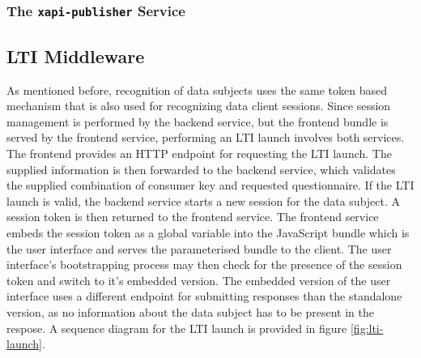 \documentclass[a4paper,11pt]{article}
\def\inline{\lstinline[basicstyle=\ttfamily,keywordstyle={}]}
\begin{document}
            \subsubsection{The \inline{xapi-publisher} Service}

        \subsection{LTI Middleware}
            As mentioned before, recognition of data subjects uses the same token based
            mechanism that is also used for recognizing data client sessions.
            Since session management is performed by the backend service,
            but the frontend bundle is served by the frontend service, performing
            an LTI launch involves both services. The frontend provides an HTTP
            endpoint for requesting the LTI launch. The supplied information
            is then forwarded to the backend service, which validates
            the supplied combination of consumer key and requested questionnaire.
            If the LTI launch is valid, the backend service starts a new session
            for the data subject. A session token is then returned to the frontend
            service. The frontend service embeds the session token as a global
            variable into the JavaScript bundle which is the user interface and
            serves the parameterised bundle to the client.
            The user interface's bootstrapping process may then check for
            the presence of the session token and switch to it's embedded version.
            The embedded version of the user interface uses a different endpoint
            for submitting responses than the standalone version, as no information
            about the data subject has to be present in the respose.
            A sequence diagram for the LTI launch is provided in figure \ref{fig:lti-launch}.
\end{document}
